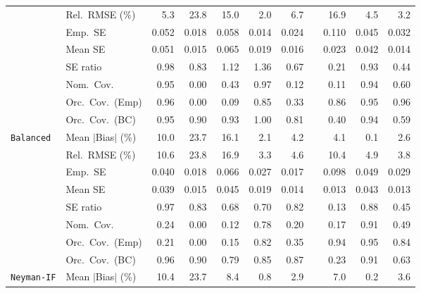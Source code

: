 \begin{landscape}
\begin{longtable}{llrrrrrrrrr}
 & Rel.\ RMSE (\%) & 5.3 & 23.8 & 15.0 & \cellcolor{rankone}2.0 & 6.7 &  & 16.9 & \cellcolor{rankthree}4.5 & \cellcolor{ranktwo}3.2 \\
 & Emp.\ SE & 0.052 & 0.018 & 0.058 & 0.014 & 0.024 &  & 0.110 & 0.045 & 0.032 \\
 & Mean SE & 0.051 & 0.015 & 0.065 & 0.019 & 0.016 &  & 0.023 & 0.042 & 0.014 \\
 & SE ratio & \cellcolor{rankone}0.98 & 0.83 & \cellcolor{rankthree}1.12 & 1.36 & 0.67 &  & 0.21 & \cellcolor{ranktwo}0.93 & 0.44 \\
 & Nom.\ Cov. & \cellcolor{rankone}0.95 & 0.00 & 0.43 & \cellcolor{rankthree}0.97 & 0.12 &  & 0.11 & \cellcolor{ranktwo}0.94 & 0.60 \\
 & Orc.\ Cov.\ (Emp) & \cellcolor{ranktwo}0.96 & 0.00 & 0.09 & 0.85 & 0.33 &  & \cellcolor{rankthree}0.86 & \cellcolor{rankone}0.95 & \cellcolor{ranktwo}0.96 \\
 & Orc.\ Cov.\ (BC) & \cellcolor{rankone}0.95 & 0.90 & \cellcolor{rankthree}0.93 & 1.00 & 0.81 &  & 0.40 & \cellcolor{ranktwo}0.94 & 0.59 \\
\addlinespace[2pt]
\quad \texttt{Balanced} & Mean $|$Bias$|$ (\%) & 10.0 & 23.7 & 16.1 & \cellcolor{ranktwo}2.1 & 4.2 &  & 4.1 & \cellcolor{rankone}0.1 & \cellcolor{rankthree}2.6 \\
 & Rel.\ RMSE (\%) & 10.6 & 23.8 & 16.9 & \cellcolor{rankone}3.3 & \cellcolor{rankthree}4.6 &  & 10.4 & 4.9 & \cellcolor{ranktwo}3.8 \\
 & Emp.\ SE & 0.040 & 0.018 & 0.066 & 0.027 & 0.017 &  & 0.098 & 0.049 & 0.029 \\
 & Mean SE & 0.039 & 0.015 & 0.045 & 0.019 & 0.014 &  & 0.013 & 0.043 & 0.013 \\
 & SE ratio & \cellcolor{rankone}0.97 & \cellcolor{rankthree}0.83 & 0.68 & 0.70 & 0.82 &  & 0.13 & \cellcolor{ranktwo}0.88 & 0.45 \\
 & Nom.\ Cov. & 0.24 & 0.00 & 0.12 & \cellcolor{ranktwo}0.78 & 0.20 &  & 0.17 & \cellcolor{rankone}0.91 & \cellcolor{rankthree}0.49 \\
 & Orc.\ Cov.\ (Emp) & 0.21 & 0.00 & 0.15 & 0.82 & 0.35 &  & \cellcolor{ranktwo}0.94 & \cellcolor{rankone}0.95 & \cellcolor{rankthree}0.84 \\
 & Orc.\ Cov.\ (BC) & \cellcolor{rankone}0.96 & \cellcolor{rankthree}0.90 & 0.79 & 0.85 & 0.87 &  & 0.23 & \cellcolor{ranktwo}0.91 & 0.63 \\
\addlinespace[2pt]
\quad \texttt{Neyman-IF} & Mean $|$Bias$|$ (\%) & 10.4 & 23.7 & 8.4 & \cellcolor{ranktwo}0.8 & \cellcolor{rankthree}2.9 &  & 7.0 & \cellcolor{rankone}0.2 & 3.6 \\

\end{longtable}
\end{landscape}
